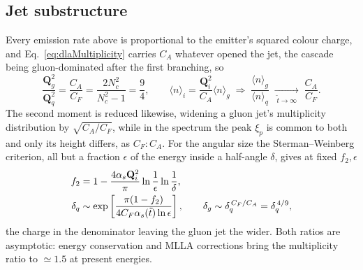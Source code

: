 \subsection{Jet substructure}
\label{subsec:substructure}

Every emission rate above is proportional to the emitter's squared colour charge, and
Eq.~\ref{eq:dlaMultiplicity} carries \(C_A\) whatever opened the jet, the cascade
being gluon-dominated after the first branching, so
\begin{equation}
	\frac{\mathbf{Q}_g^2}{\mathbf{Q}_q^2} = \frac{C_A}{C_F}
	= \frac{2N_c^2}{N_c^2-1} = \frac{9}{4} ,
	\qquad
	\langle n\rangle_i = \frac{\mathbf{Q}_i^2}{C_A}\langle n\rangle_g
	\;\Longrightarrow\;
	\frac{\langle n\rangle_g}{\langle n\rangle_q}
	\;\xrightarrow[\;\tilde{t}\to\infty\;]{}\;\frac{C_A}{C_F} .
	\label{eq:casimirRatio}
\end{equation}
The second moment is reduced likewise, widening a gluon jet's multiplicity
distribution by \(\sqrt{C_A/C_F}\), while in the spectrum the peak \(\xi_p\) is common
to both and only its height differs, as \(C_F:C_A\). For the angular size the
Sterman--Weinberg criterion, all but a fraction \(\epsilon\) of the energy inside a
half-angle \(\delta\), gives at fixed \(f_2,\epsilon\)
\begin{align}
	f_2 &= 1 - \frac{4\alpha_s\mathbf{Q}_i^2}{\pi}
	\ln\frac{1}{\epsilon}\ln\frac{1}{\delta} , \notag\\
	\delta_q &\sim \exp\left[\frac{\pi(1-f_2)}
	{4C_F\alpha_s(\tilde{t})\ln\epsilon}\right] ,
	\qquad
	\delta_g \sim \delta_q^{\,C_F/C_A} = \delta_q^{\,4/9} ,
	\label{eq:swWidth}
\end{align}
the charge in the denominator leaving the gluon jet the wider. Both ratios are
asymptotic: energy conservation and MLLA corrections bring the multiplicity ratio to
\(\simeq1.5\) at present energies.

